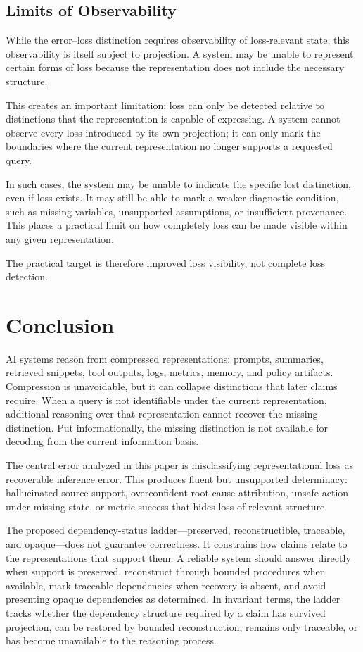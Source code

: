 \documentclass[11pt]{article}
\begin{document}
\subsection{Limits of Observability}

While the error--loss distinction requires observability of loss-relevant state, this observability is itself subject to projection. A system may be unable to represent certain forms of loss because the representation does not include the necessary structure.

This creates an important limitation: loss can only be detected relative to distinctions that the representation is capable of expressing. A system cannot observe every loss introduced by its own projection; it can only mark the boundaries where the current representation no longer supports a requested query.

In such cases, the system may be unable to indicate the specific lost distinction, even if loss exists. It may still be able to mark a weaker diagnostic condition, such as missing variables, unsupported assumptions, or insufficient provenance. This places a practical limit on how completely loss can be made visible within any given representation.

The practical target is therefore improved loss visibility, not complete loss detection.

\section{Conclusion}

AI systems reason from compressed representations: prompts, summaries, retrieved snippets, tool outputs, logs, metrics, memory, and policy artifacts. Compression is unavoidable, but it can collapse distinctions that later claims require. When a query is not identifiable under the current representation, additional reasoning over that representation cannot recover the missing distinction. Put informationally, the missing distinction is not available for decoding from the current information basis.

The central error analyzed in this paper is misclassifying representational loss as recoverable inference error. This produces fluent but unsupported determinacy: hallucinated source support, overconfident root-cause attribution, unsafe action under missing state, or metric success that hides loss of relevant structure.

The proposed dependency-status ladder---preserved, reconstructible, traceable, and opaque---does not guarantee correctness. It constrains how claims relate to the representations that support them. A reliable system should answer directly when support is preserved, reconstruct through bounded procedures when available, mark traceable dependencies when recovery is absent, and avoid presenting opaque dependencies as determined. In invariant terms, the ladder tracks whether the dependency structure required by a claim has survived projection, can be restored by bounded reconstruction, remains only traceable, or has become unavailable to the reasoning process.
\end{document}
